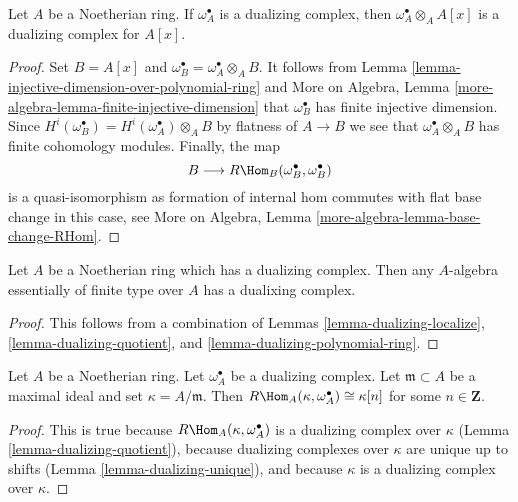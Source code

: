 \begin{lemma}
\label{lemma-dualizing-polynomial-ring}
Let $A$ be a Noetherian ring. If $\omega_A^\bullet$ is a dualizing
complex, then $\omega_A^\bullet \otimes_A A[x]$ is a dualizing
complex for $A[x]$.
\end{lemma}

\begin{proof}
Set $B = A[x]$ and $\omega_B^\bullet = \omega_A^\bullet \otimes_A B$.
It follows from Lemma \ref{lemma-injective-dimension-over-polynomial-ring}
and More on Algebra, Lemma \ref{more-algebra-lemma-finite-injective-dimension}
that $\omega_B^\bullet$ has finite injective dimension.
Since $H^i(\omega_B^\bullet) = H^i(\omega_A^\bullet) \otimes_A B$
by flatness of $A \to B$ we see that $\omega_A^\bullet \otimes_A B$
has finite cohomology modules. Finally, the map
$$
B \longrightarrow R\Hom_B(\omega_B^\bullet, \omega_B^\bullet)
$$
is a quasi-isomorphism as formation of internal hom commutes with
flat base change in this case, see
More on Algebra, Lemma \ref{more-algebra-lemma-base-change-RHom}.
\end{proof}

\begin{proposition}
\label{proposition-dualizing-essentially-finite-type}
Let $A$ be a Noetherian ring which has a dualizing complex.
Then any $A$-algebra essentially of finite type over $A$
has a dualixing complex.
\end{proposition}

\begin{proof}
This follows from a combination of
Lemmas \ref{lemma-dualizing-localize},
\ref{lemma-dualizing-quotient}, and \ref{lemma-dualizing-polynomial-ring}.
\end{proof}

\begin{lemma}
\label{lemma-find-function}
Let $A$ be a Noetherian ring. Let $\omega_A^\bullet$ be a dualizing
complex. Let $\mathfrak m \subset A$ be a maximal ideal and set
$\kappa = A/\mathfrak m$. Then
$R\Hom_A(\kappa, \omega_A^\bullet) \cong \kappa[n]$ for some
$n \in \mathbf{Z}$.
\end{lemma}

\begin{proof}
This is true because $R\Hom_A(\kappa, \omega_A^\bullet)$ is a dualizing
complex over $\kappa$ (Lemma \ref{lemma-dualizing-quotient}),
because dualizing complexes over $\kappa$ are unique up to shifts
(Lemma \ref{lemma-dualizing-unique}), and because $\kappa$ is a
dualizing complex over $\kappa$.
\end{proof}




